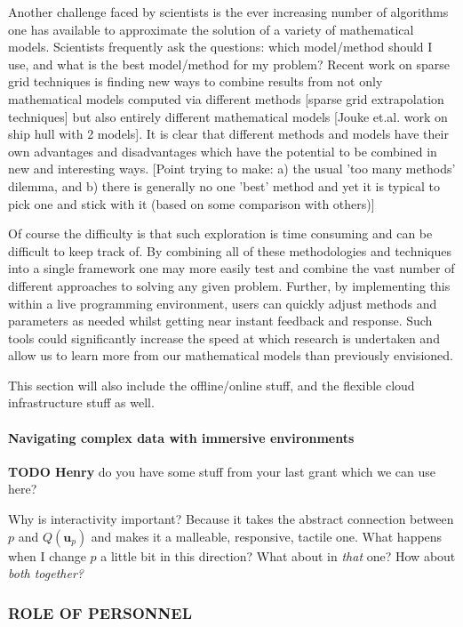 \documentclass[a4paper,fontsize=12pt]{scrartcl}
\begin{document}
Another challenge faced by scientists is the ever increasing number of
algorithms one has available to approximate the solution of a variety
of mathematical models. Scientists frequently ask the questions: which
model/method should I use, and what is the best model/method for my
problem? Recent work on sparse grid techniques is finding new ways to
combine results from not only mathematical models computed via
different methods [sparse grid extrapolation techniques] but also
entirely different mathematical models [Jouke et.al. work on ship hull
with 2 models]. It is clear that different methods and models have
their own advantages and disadvantages which have the potential to be
combined in new and interesting ways. [Point trying to make: a) the
usual 'too many methods' dilemma, and b) there is generally no one
'best' method and yet it is typical to pick one and stick with it
(based on some comparison with others)]

Of course the difficulty is that such exploration is time consuming
and can be difficult to keep track of. By combining all of these
methodologies and techniques into a single framework one may more
easily test and combine the vast number of different approaches to
solving any given problem. Further, by implementing this within a live
programming environment, users can quickly adjust methods and
parameters as needed whilst getting near instant feedback and
response. Such tools could significantly increase the speed at which
research is undertaken and allow us to learn more from our
mathematical models than previously envisioned.

This section will also include the offline/online stuff, and the
flexible cloud infrastructure stuff as well.

\paragraph{Navigating complex data with immersive environments}

\noindent
\textbf{TODO Henry} do you have some stuff from your last grant which
we can use here?

Why is interactivity important? Because it takes the abstract
connection between $p$ and $Q(\mathbf{u}_p)$ and makes it a malleable,
responsive, tactile one. What happens when I change $p$ a little bit
in this direction? What about in \emph{that} one? How about \emph{both
  together?}

\subsubsection*{ROLE OF PERSONNEL}
\end{document}
